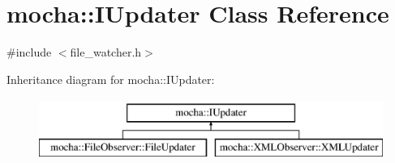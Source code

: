 \hypertarget{classmocha_1_1_i_updater}{
\section{mocha::IUpdater Class Reference}
\label{classmocha_1_1_i_updater}
}


{\ttfamily \#include $<$file\_\-watcher.h$>$}

Inheritance diagram for mocha::IUpdater:\begin{figure}[H]
\begin{center}
\leavevmode
\includegraphics[height=2.000000cm]{classmocha_1_1_i_updater}
\end{center}
\end{figure}
